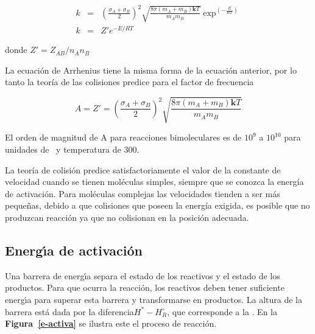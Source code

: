 \begin{eqnarray}
 k&=&\left(\frac{ \sigma_A+ \sigma_B }{ 2 }\right)^2 \sqrt{\frac{8 \pi(m_A+m_B)\textbf{k}T }{m_Am_B}} \exp^{(-\frac{E}{RT})} \\
 k&=&Z'e^{-E/RT}
\end{eqnarray}

donde \( Z'=Z_{AB}/n_An_B \)

La ecuación de Arrhenius  tiene la misma forma de la ecuación anterior, por lo tanto la teoría de las colisiones predice para el factor de frecuencia 

\begin{equation}
A=Z'= \left(\frac{ \sigma_A+ \sigma_B }{ 2 }\right)^2 \sqrt{\frac{8 \pi(m_A+m_B)\textbf{k}T }{m_Am_B}}
\end{equation}

El orden de magnitud de A para reacciones bimoleculares es de $10^9$ a $10^{10}$ para unidades de \mole\per\liter~y temperatura de 300\kelvin.

La teoría de colisión predice satisfactoriamente el valor de la constante de velocidad cuando se tienen moléculas simples, siempre que se conozca la energía de activación. Para moléculas complejas las velocidades tienden a ser más pequeñas, debido a que  colisiones que poseen la energía exigida, es posible que no produzcan reacción ya que no colisionan en la posición adecuada.

\subsection{Energ\'{\i}a de activaci\'on}

Una barrera de energ\'{\i}a separa el estado de los reactivos y el estado de los productos. Para que ocurra la reacción, los reactivos deben tener suficiente energ\'{\i}a para superar esta barrera y transformarse en productos. La altura de la barrera está dada por la diferencia$H^* - H^\circ _R$, que corresponde a la .
  En la \textbf{Figura~\ref{e-activa}} se ilustra este el proceso de reacci\'on. 

